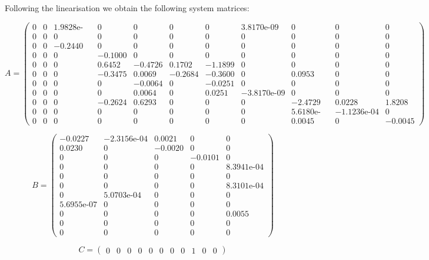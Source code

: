 Following the linearisation we obtain the following system matrices:

\begin{equation}  \label{eq:A_full}
	A =
	\left(\begin{array}{ccccccccccc}
		0 & 0 & \text{1.9828e-04} & 0 & 0 & 0 & 0 & \text{3.8170e-09} & 0 & 0 & 0\\
		0 & 0 & 0 & 0 & 0 & 0 & 0 & 0 & 0 & 0 & 0\\
		0 & 0 & -0.2440 & 0 & 0 & 0 & 0 & 0 & 0 & 0 & 0\\
		0 & 0 & 0 & -0.1000 & 0 & 0 & 0 & 0 & 0 & 0 & 0\\
		0 & 0 & 0 & 0.6452 & -0.4726 & 0.1702 & -1.1899 & 0 & 0 & 0 & 0\\
		0 & 0 & 0 & -0.3475 & 0.0069 & -0.2684 & -0.3600 & 0 & 0.0953 & 0 & 0\\
		0 & 0 & 0 & 0 & -0.0064 & 0 & -0.0251 & 0 & 0 & 0 & 0\\
		0 & 0 & 0 & 0 & 0.0064 & 0 & 0.0251 & -\text{3.8170e-09} & 0 & 0 & 0\\
		0 & 0 & 0 & -0.2624 & 0.6293 & 0 & 0 & 0 & -2.4729 & 0.0228 & 1.8208\\
		0 & 0 & 0 & 0 & 0 & 0 & 0 & 0 & \text{5.6180e-05} & -\text{1.1236e-04} & 0\\
		0 & 0 & 0 & 0 & 0 & 0 & 0 & 0 & 0.0045 & 0 & -0.0045
	\end{array}\right)
\end{equation}

\begin{equation}  \label{eq:B_full}
	B = \left(\begin{array}{ccccc}
		-0.0227 & -\text{2.3156e-04} & 0.0021 & 0 & 0\\
		0.0230 & 0 & -0.0020 & 0 & 0\\
		0 & 0 & 0 & -0.0101 & 0\\
		0 & 0 & 0 & 0 & \text{8.3941e-04}\\
		0 & 0 & 0 & 0 & 0\\
		0 & 0 & 0 & 0 & \text{8.3101e-04}\\
		0 & \text{5.0703e-04} & 0 & 0 & 0\\
		\text{5.6955e-07} & 0 & 0 & 0 & 0\\
		0 & 0 & 0 & 0 & 0.0055\\
		0 & 0 & 0 & 0 & 0\\
		0 & 0 & 0 & 0 & 0
	\end{array}\right)
\end{equation}

\begin{equation}  \label{eq:C_full}
	C = \left(\begin{array}{ccccccccccc}
		0 & 0 & 0 & 0 & 0 & 0 & 0 & 0 & 1 & 0 & 0
	\end{array}\right)
\end{equation}

